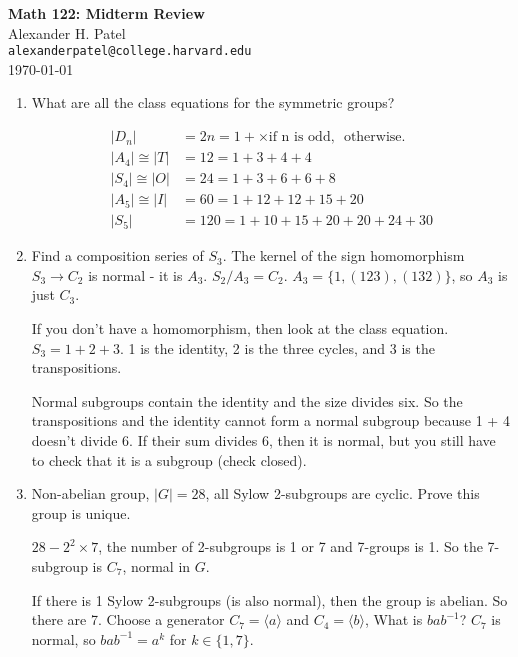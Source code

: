 \documentclass[12pt]{article}
\begin{document}
\begin{center}
\textbf{Math 122: Midterm Review} \\
Alexander H. Patel \\
{\tt alexanderpatel@college.harvard.edu} \\
\today
\end{center}

\begin{enumerate}
    \item
        What are all the class equations for the symmetric groups?

        \begin{align*}
            |D_n| &= 2n = 1 + \times  \text{if n is odd, } \text{ otherwise. } \\
            |A_4| \cong |T| &= 12 = 1 + 3 + 4 + 4 \\
            |S_4| \cong |O| &= 24 = 1 + 3 + 6 + 6 + 8 \\
            |A_5| \cong |I| &= 60 = 1 + 12 + 12 + 15 + 20 \\
            |S_5| &= 120 = 1 + 10 + 15 + 20 + 20 + 24 + 30
        \end{align*}

    \item
        Find a composition series of $S_3$. The kernel of the sign
        homomorphism $S_3 \rightarrow C_2$ is normal - it is $A_3$. $S_2/A_3 =
        C_2$. $A_3 = \{1, (123), (132)\}$, so $A_3$ is just $C_3$.

        If you don't have a homomorphism, then look at the class equation. $S_3
        = 1 + 2 + 3$. 1 is the identity, 2 is the three cycles, and 3 is the
        transpositions.

        Normal subgroups contain the identity and the size divides six. So the
        transpositions and the identity cannot form a normal subgroup because 1
        + 4 doesn't divide 6. If their sum divides 6, then it is normal, but
        you still have to check that it is a subgroup (check closed).
    \item
        Non-abelian group, $|G| =28$, all Sylow 2-subgroups are cyclic. Prove
        this group is unique.

        $28 - 2^2 \times 7$, the number of 2-subgroups is 1 or 7 and 7-groups
        is 1. So the 7-subgroup is $C_7$, normal in $G$. 

        If there is 1 Sylow 2-subgroups (is also normal), then the group is
        abelian. So there are 7. Choose a generator $C_7 = \langle a \rangle$
        and $C_4 = \langle b \rangle$, What is $bab^{-1}$? $C_7$ is normal, so
        $bab^{-1} = a^k$ for $k \in \{1, 7\}$.


\end{enumerate}
\end{document}
